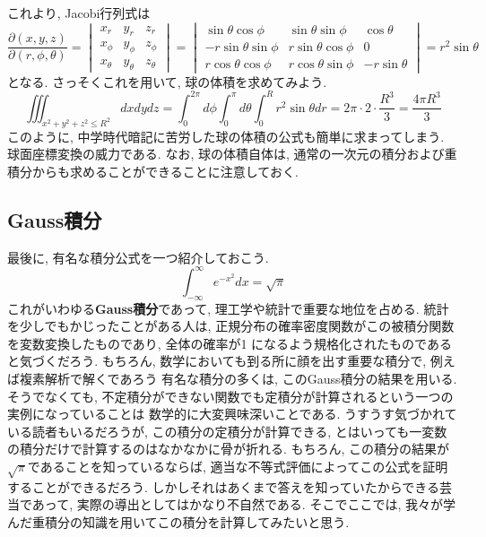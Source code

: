         これより, Jacobi行列式は
        \begin{equation*}
            \frac{\partial(x,y,z)}{\partial(r,\phi,\theta)}=
            \begin{vmatrix}
                x_r & y_r & z_r \\
                x_\phi & y_\phi & z_\phi\\
                x_\theta & y_\theta & z_\theta
            \end{vmatrix}
            =
            \begin{vmatrix}
                \sin\theta\cos\phi & \sin\theta\sin\phi & \cos\theta \\
                -r\sin\theta\sin\phi & r\sin\theta\cos\phi & 0\\
                r\cos\theta\cos\phi & r\cos\theta\sin\phi & -r\sin\theta
            \end{vmatrix}
            =r^2\sin\theta \label{eq:多重積分:球面座標のヤコビアン}
        \end{equation*}
        となる. さっそくこれを用いて, 球の体積を求めてみよう.
        \begin{equation*}
            \iiint_{x^2+y^2+z^2\leq R^2}dxdydz=\int_{0}^{2\pi}d\phi\int_{0}^{\pi}d\theta\int_{0}^{R}r^2\sin\theta dr=2\pi\cdot 2\cdot \frac{R^3}{3}=\frac{4\pi R^3}{3}
        \end{equation*}
        このように, 中学時代暗記に苦労した球の体積の公式も簡単に求まってしまう. 球面座標変換の威力である. なお, 球の体積自体は, 通常の一次元の積分および重積分からも求めることができることに注意しておく.
    \clearpage
    \subsection{Gauss積分}
        最後に, 有名な積分公式を一つ紹介しておこう.
        \begin{equation}
            \int_{-\infty}^{\infty}e^{-x^2}dx = \sqrt{\pi}\label{eq:多重積分:ガウス積分}
        \end{equation}
        これがいわゆる\textbf{Gauss積分}であって, 理工学や統計で重要な地位を占める. 
        統計を少しでもかじったことがある人は, 正規分布の確率密度関数がこの被積分関数を変数変換したものであり, 全体の確率が1
        になるよう規格化されたものであると気づくだろう. もちろん, 数学においても到る所に顔を出す重要な積分で, 例えば複素解析で解くであろう
        有名な積分の多くは, このGauss積分の結果を用いる. そうでなくても, 不定積分ができない関数でも定積分が計算されるという一つの実例になっていることは
        数学的に大変興味深いことである. うすうす気づかれている読者もいるだろうが, この積分の定積分が計算できる, とはいっても一変数の積分だけで計算するのはなかなかに骨が折れる.
        もちろん, この積分の結果が$\sqrt{\pi}$であることを知っているならば, 適当な不等式評価によってこの公式を証明することができるだろう.
        しかしそれはあくまで答えを知っていたからできる芸当であって, 実際の導出としてはかなり不自然である. そこでここでは, 我々が学んだ重積分の知識を用いてこの積分を計算してみたいと思う.

